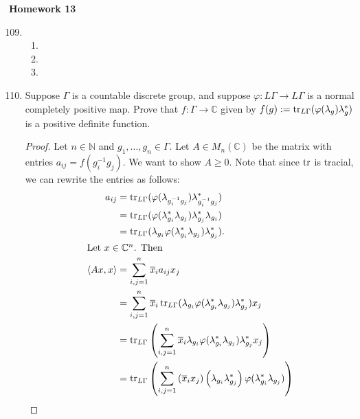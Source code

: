 \documentclass[a4paper,10pt]{report}
\newcommand{\ggen}[1]{\langle#1\rangle}
\newcommand{\N}{\mathbb{N}}
\newcommand{\C}{\mathbb{C}}
\begin{document}

\pagestyle{fancy}	
\fancyhf{} %
\setlength{\headheight}{60pt}

\begin{center}
	\textbf{Homework 13}
\end{center}
\begin{enumerate}
		\setcounter{enumi}{108}
	\item
		\begin{enumerate}
			\item 
			\item 
			\item 
		\end{enumerate}
	\item	Suppose $\Gamma$ is a countable discrete group,
		and suppose $\varphi : L\Gamma \to L\Gamma$ is a normal completely positive map.
		Prove that $f : \Gamma \to \C$ given by $f(g) := \operatorname{tr}_{L\Gamma}(\varphi(\lambda_g)\lambda_g^*)$
		is a positive definite function.
		\begin{proof}
			Let $n \in \N$ and $g_1, \dots, g_n \in \Gamma$.
			Let $A \in M_n(\C)$ be the matrix with entries $a_{ij} = f(g_i^{-1}g_j)$.
			We want to show $A \ge 0$.
			Note that since $\operatorname{tr}$ is tracial, we can rewrite the entries as follows:
			\begin{align*}
				a_{ij} & = \tr_{L\Gamma}(\varphi(\lambda_{g_i^{-1}g_j})\lambda_{g_i^{-1}g_j}^*) \\
				 & = \tr_{L\Gamma}(\varphi(\lambda_{g_i}^* \lambda_{g_j})
				 \lambda_{g_j}^*\lambda_{g_i}) \\
				 & = \tr_{L\Gamma}(\lambda_{g_i}\varphi(\lambda_{g_i}^* \lambda_{g_j})
				 \lambda_{g_j}^*). \\
			\intertext{Let $x \in \C^n$. Then}
				\ggen{Ax, x} & = \sum_{i,j=1}^n{\overline{x}_i a_{ij} x_j} \\
				 & = \sum_{i,j=1}^n{\overline{x}_i \tr_{L\Gamma}(\lambda_{g_i}
				 \varphi(\lambda_{g_i}^* \lambda_{g_j})\lambda_{g_j}^*) x_j} \\
				 & = \tr_{L\Gamma}\left( \sum_{i,j=1}^n{\overline{x}_i \lambda_{g_i}
				 \varphi(\lambda_{g_i}^* \lambda_{g_j})\lambda_{g_j}^* x_j} \right) \\
				 & = \tr_{L\Gamma}\left( \sum_{i,j=1}^n{
				 \left( \overline{x}_i x_j \right)
				\left( \lambda_{g_i} \lambda_{g_j}^* \right)
				\varphi(\lambda_{g_i}^* \lambda_{g_j})} \right)
			\end{align*}
			

\end{proof}
\end{enumerate}
\end{document}
